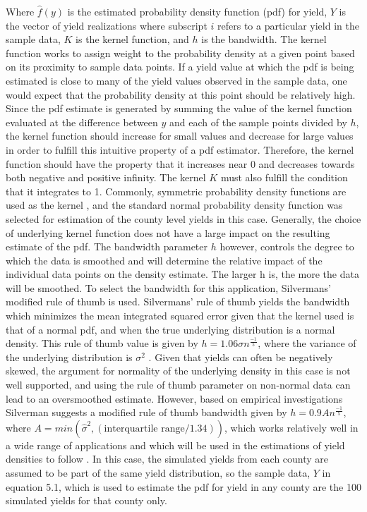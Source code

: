 Where $\hat{f}(y)$ is the estimated probability density function (pdf) for yield, $Y$ is the vector of yield realizations where subscript $i$ refers to a particular yield in the sample data, $K$ is the kernel function, and $h$ is the bandwidth. The kernel function works to assign weight to the probability density at a given point based on its proximity to sample data points. If a yield value at which the pdf is being estimated is close to many of the yield values observed in the sample data, one would expect that the probability density at this point should be relatively high. Since the pdf estimate is generated by summing the value of the kernel function evaluated at the difference between $y$ and each of the sample points divided by $h$, the kernel function should increase for small values and decrease for large values in order to fulfill this intuitive property of a pdf estimator. Therefore, the kernel function should have the property that it increases near 0 and decreases towards both negative and positive infinity. The kernel $K$ must also fulfill the condition that it integrates to 1. Commonly, symmetric probability density functions are used as the kernel \citep{ker2000nonparametric}, and the standard normal probability density function was selected for estimation of the county level yields in this case. Generally, the choice of underlying kernel function does not have a large impact on the resulting estimate of the pdf. The bandwidth parameter $h$ however, controls the degree to which the data is smoothed and will determine the relative impact of the individual data points on the density estimate. The larger h is, the more the data will be smoothed. To select the bandwidth for this application, Silvermans' modified rule of thumb is used. Silvermans' rule of thumb yields the bandwidth which minimizes the mean integrated squared error given that the kernel used is that of a normal pdf, and when the true underlying distribution is a normal density. This rule of thumb value is given by $h=1.06\sigma n^{\frac{-1}{5}}$, where the variance of the underlying distribution  is $\sigma^2$ \citep{silverman1986density}. Given that yields can often be negatively skewed, the argument for normality of the underlying density in this case is not well supported, and using the rule of thumb parameter on non-normal data can lead to an oversmoothed estimate. However, based on empirical investigations Silverman suggests a modified rule of thumb bandwidth given by $h=0.9An^{\frac{-1}{5}}$, where $A=min(\hat{\sigma}^2,(\text{interquartile range}/1.34))$, which works relatively well in a wide range of applications and which will be used in the estimations of yield densities to follow \citep{silverman1986density}. In this case, the simulated yields from each county are assumed to be part of the same yield distribution, so the sample data, $Y$ in equation 5.1, which is used to estimate the pdf for yield in any county are the 100 simulated yields for that county only.

